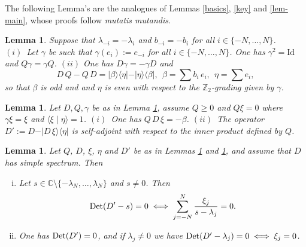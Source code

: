 \documentclass{amsart}
\newtheorem{lem}[thm]{Lemma}
\def\id{{\rm id}}
\def\C{{\mathbb C}}
\def\Z{{\mathbb Z}}
\def\id{{\mbox{Id}}}
\def\id{{\rm id}}
\def\C{{\mathbb C}}
\def\Z{{\mathbb Z}}
\def\id{{\mbox{Id}}}
\begin{document}
The following Lemma's are the analogues of Lemmas \ref{basics}, \ref{key} and \ref{lem-main}, whose proofs follow {\em mutatis mutandis}.
\begin{lem}
  \label{basics-general}
  Suppose that $\lambda_{-i} = - \lambda_i$ and $b_{-i} = -b_{i}$ for all $i \in \{ -N, \ldots, N\}$.\\
$(i)$~Let $\gamma$ be such that $\gamma(e_i):=e_{-i}$ for all $i\in \{-N,\ldots,N\}$. One has $\gamma^2=\id$ and $Q\gamma=\gamma Q$.\newline
$(ii)$ One has $D\gamma=-\gamma D$ and 
\begin{equation}\label{QD-sa}
D\,	Q-Q\, D=\vert \beta\rangle\langle \eta\vert -\vert \eta\rangle\langle \beta\vert, \ \ \beta=\sum b_i \,e_i,\ \ \eta=\sum e_i,
\end{equation}
so that $\beta$ is odd and and $\eta$ is even with respect to the $\Z_2$-grading given by $\gamma$.
\end{lem}

\begin{lem}
  \label{key-general}
Let $D,Q,\gamma$ be as in Lemma \ref{basics-general}, assume $Q\geq 0$ and $Q\xi=0$ where $\gamma \xi=\xi$ and $\langle \xi\mid \eta\rangle=1$. \newline
$(i)$~One has $Q\, D\,\xi=-\beta $.\newline
$(ii)$~The operator $D':=D-\vert D\,\xi\rangle\langle \eta\vert$ is self-adjoint with respect to the inner product defined by $Q$.	
\end{lem}




 \begin{lem}\label{main-odd} Let $Q$, $D$, $\xi$, $\eta$ and $D'$ be as in Lemmas \ref{basics-general} and \ref{key-general}, and assume that $D$ has simple spectrum. Then
   \begin{enumerate}[(i)]
\item Let $s\in \C \setminus \{-\lambda_N,\ldots,\lambda_N\}$ and $s \neq 0$. Then 
 \begin{equation}\label{equiv}
 {\rm Det}(D'-s)=0\iff \sum_{j=-N}^N \frac{\xi_j}{s-\lambda_j}=0.
\end{equation}
\item One has $ {\rm Det}(D')=0$, and if $\lambda_j \neq 0$ we have ${\rm Det}(D'-\lambda_j )=0\iff \xi_j=0$.
   \end{enumerate}
   \end{lem}
\end{document}
